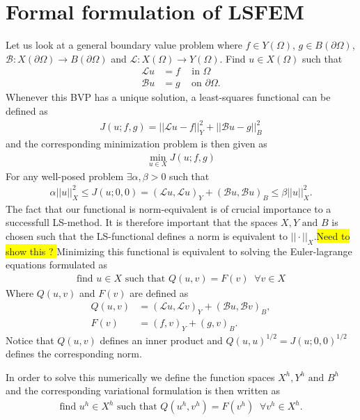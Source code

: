 \section{ Formal formulation of LSFEM}
Let us look at a general boundary value problem where $f \in Y(\Omega)$, $g \in B(\partial \Omega)$, $\mathcal{B}\colon X(\partial \Omega) \to B(\partial\Omega) $ and $\mathcal{L}\colon X(\Omega)\to Y(\Omega)$. Find $u \in X(\Omega) $ such that 
\begin{align}
	\mathcal{L} u &= f \; \; \; \text{ in } \Omega \\
	\mathcal{B}u &= g \; \; \; \text{ on } \partial \Omega.
	\label{eq:BVP}
\end{align}
Whenever this BVP has a unique solution, a least-squares functional can be defined as 
\begin{align}
	J(u;f,g) = ||\mathcal{L}u-f||^2_Y + ||\mathcal{B}u-g||^2_B
	\label{eq:FunctionalGen}
\end{align}
and the corresponding minimization problem is then given as 
\begin{align}
	\min_{u \in X}J(u;f,g)
	\label{eq:minProbGen}
\end{align}
For any well-posed problem $\exists \alpha,\beta > 0$ such that 
\begin{align}
	\alpha||u||_X^2 \leq J(u;0,0) = (\mathcal{L}u,\mathcal{L}u)_Y+(\mathcal{B}u,\mathcal{B}u)_B \leq \beta||u||_X^2.
	\label{eq:normEq}
\end{align}
The fact that our functional is norm-equivalent is of crucial importance to a successfull LS-method. It is therefore important that the spaces $X,Y \text{ and } B$ is chosen such that the LS-functional defines a norm is equivalent to $|| \cdot ||_X$.\colorbox{yellow}{Need to show this ? }
Minimizing this functional is equivalent to solving the Euler-lagrange equations formulated as 
\begin{align}
	\text{find } u \in X \text{  such that  } Q(u,v) = F(v) \; \; \forall v\in X
	\label{eq:varFormGen}
\end{align}
Where $Q(u,v)$ and $F(v)$ are defined as 
\begin{align}
	Q(u,v) &= (\mathcal{L}u,\mathcal{L}v)_Y+(\mathcal{B}u,\mathcal{B}v)_B, \\
	F(v) &= (f,v)_Y+(g,v)_B.
	\label{VarFormLinForms}
\end{align}
%
Notice that $Q(u,v)$ defines an inner product and $Q(u,u)^{1/2}=J(u;0,0)^{1/2}$ defines the corresponding norm. 

In order to solve this numerically we define the function spaces $X^h, Y^h \text{ and } B^h$ and the corresponding variational formulation is then written as 
\begin{align}
	\text{find } u^h \in X^h \text{  such that  } Q(u^h,v^h) = F(v^h) \; \; \forall v^h\in X^h.
	\label{eq:varFormGenDisc}
\end{align}
~\cite{Bochev}
%
